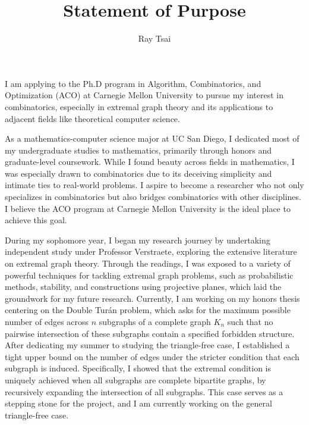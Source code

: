 \documentclass[12pt]{article}
\title{Statement of Purpose}
\author{Ray Tsai}
\date{}
\begin{document}
\maketitle

\vspace{-0.25in}

I am applying to the Ph.D program in Algorithm, Combinatorics, and Optimization (ACO) at Carnegie
Mellon University to pursue my interest in combinatorics, especially in extremal graph theory and
its applications to adjacent fields like theoretical computer science. 

As a mathematics-computer science major at UC San Diego, I dedicated most of my undergraduate
studies to mathematics, primarily through honors and graduate-level coursework. While I found beauty
across fields in mathematics, I was especially drawn to combinatorics due to its deceiving
simplicity and intimate ties to real-world problems. I aspire to become a researcher who not only
specializes in combinatorics but also bridges combinatorics with other disciplines. I believe the
ACO program at Carnegie Mellon University is the ideal place to achieve this goal.

During my sophomore year, I began my research journey by undertaking independent study under
Professor Verstraete, exploring the extensive literature on extremal graph theory. Through the
readings, I was exposed to a variety of powerful techniques for tackling extremal graph problems,
such as probabilistic methods, stability, and constructions using projective planes, which laid the
groundwork for my future research. Currently, I am working on my honors thesis centering on the
Double Turán problem, which asks for the maximum possible number of edges across $n$ subgraphs of a
complete graph $K_n$ such that no pairwise intersection of these subgraphs contain a specified
forbidden structure. After dedicating my summer to studying the triangle-free case, I established a
tight upper bound on the number of edges under the stricter condition that each subgraph is induced.
Specifically, I showed that the extremal condition is uniquely achieved when all subgraphs are
complete bipartite graphs, by recursively expanding the intersection of all subgraphs. This case
serves as a stepping stone for the project, and I am currently working on the general triangle-free
case. 
\end{document}
